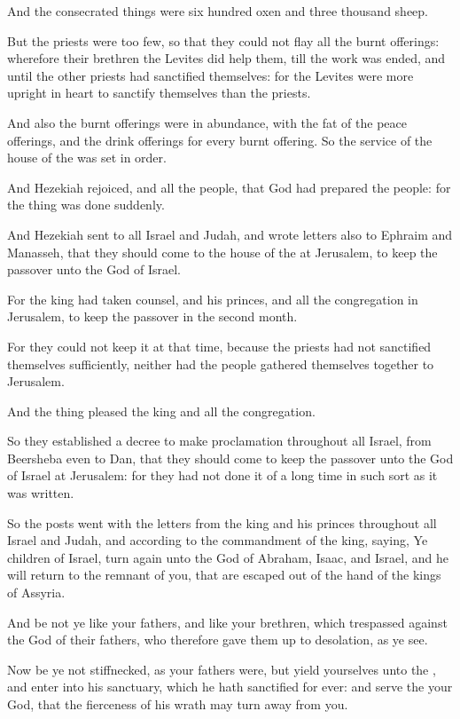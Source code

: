 \Verse And the consecrated things were six hundred oxen and three thousand sheep.

\Verse But the priests were too few, so that they could not flay all the burnt offerings: wherefore their brethren the Levites did help them, till the work was ended, and until the other priests had sanctified themselves: for the Levites were more upright in heart to sanctify themselves than the priests.

\Verse And also the burnt offerings were in abundance, with the fat of the peace offerings, and the drink offerings for every burnt offering.  So the service of the house of the \LORD was set in order.

\Verse And Hezekiah rejoiced, and all the people, that God had prepared the people: for the thing was done suddenly.


\Chapter
\Verse And Hezekiah sent to all Israel and Judah, and wrote letters also to Ephraim and Manasseh, that they should come to the house of the \LORD at Jerusalem, to keep the passover unto the \LORD God of Israel.

\Verse For the king had taken counsel, and his princes, and all the congregation in Jerusalem, to keep the passover in the second month.

\Verse For they could not keep it at that time, because the priests had not sanctified themselves sufficiently, neither had the people gathered themselves together to Jerusalem.

\Verse And the thing pleased the king and all the congregation.

\Verse So they established a decree to make proclamation throughout all Israel, from Beersheba even to Dan, that they should come to keep the passover unto the \LORD God of Israel at Jerusalem: for they had not done it of a long time in such sort as it was written.

\Verse So the posts went with the letters from the king and his princes throughout all Israel and Judah, and according to the commandment of the king, saying, Ye children of Israel, turn again unto the \LORD God of Abraham, Isaac, and Israel, and he will return to the remnant of you, that are escaped out of the hand of the kings of Assyria.

\Verse And be not ye like your fathers, and like your brethren, which trespassed against the \LORD God of their fathers, who therefore gave them up to desolation, as ye see.

\Verse Now be ye not stiffnecked, as your fathers were, but yield yourselves unto the \LORD, and enter into his sanctuary, which he hath sanctified for ever: and serve the \LORD your God, that the fierceness of his wrath may turn away from you.

